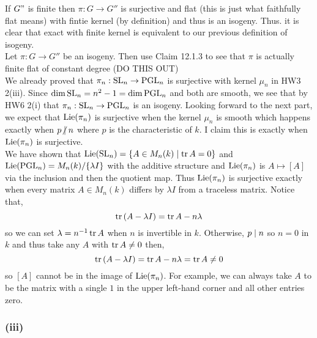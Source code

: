\documentclass[12pt]{article}
\begin{document}
If $G"$ is finite then $\pi : G \to G''$ is surjective and flat (this is just what faithfully flat means) with fintie kernel (by definition) and thus is an isogeny. Thus. it is clear that exact with finite kernel is equivalent to our previous definition of isogeny.
\bigskip\\
Let $\pi : G \to G''$ be an isogeny. Then use Claim 12.1.3 to see that $\pi$ is actually finite flat of constant degree (DO THIS OUT)
\bigskip\\
We already proved that $\pi_n : \mathrm{SL}_n \to \mathrm{PGL}_n$ is surjective with kernel $\mu_n$ in HW3 2(iii). Since $\dim{\mathrm{SL}_n} = n^2 - 1 = \dim{\mathrm{PGL}_n}$ and both are smooth, we see that by HW6 2(i) that $\pi_n : \mathrm{SL}_n \to \mathrm{PGL}_n$ is an isogeny. Looking forward to the next part, we expect that $\mathrm{Lie}(\pi_n)$ is surjective when the kernel $\mu_n$ is smooth which happens exactly when $p \ndivides n$ where $p$ is the characteristic of $k$. I claim this is exactly when $\mathrm{Lie}(\pi_n)$ is surjective.
\bigskip\\
We have shown that $\mathrm{Lie}(\mathrm{SL}_n) = \{ A \in M_n(k) \mid \operatorname{\mathrm{tr}}{A} = 0 \}$ and $\mathrm{Lie}(\mathrm{PGL}_n)  = M_n(k) / \{ \lambda I \}$ with the additive structure and $\mathrm{Lie}(\pi_n)$ is $A \mapsto [A]$ via the inclusion and then the quotient map. Thus $\mathrm{Lie}(\pi_n)$ is surjective exactly when every matrix $A \in M_n(k)$ differs by $\lambda I$ from a traceless matrix. Notice that,
\[ \operatorname{\mathrm{tr}}{(A - \lambda I)} = \operatorname{\mathrm{tr}}{A} - n \lambda \]
so we can set $\lambda = n^{-1} \operatorname{\mathrm{tr}}{A}$ when $n$ is invertible in $k$. Otherwise, $p \mid n$ so $n = 0$ in $k$ and thus take any $A$ with $\operatorname{\mathrm{tr}}{A} \neq 0$ then,
\[ \operatorname{\mathrm{tr}}{(A - \lambda I)} = \operatorname{\mathrm{tr}}{A} - n \lambda = \operatorname{\mathrm{tr}}{A} \neq 0 \]
so $[A]$ cannot be in the image of $\mathrm{Lie}(\pi_n)$. For example, we can always take $A$ to be the matrix with a single $1$ in the upper left-hand corner and all other entries zero.


\subsubsection{(iii)}
\end{document}
